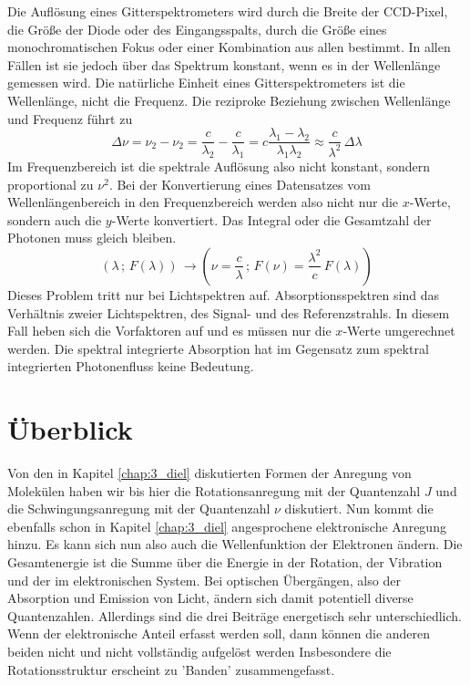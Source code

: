 Die Auflösung eines Gitterspektrometers wird durch die Breite der CCD-Pixel, die Größe der Diode oder des Eingangsspalts, durch die Größe eines monochromatischen Fokus oder einer Kombination aus allen bestimmt. In allen Fällen ist sie jedoch über das Spektrum konstant, wenn es in der Wellenlänge gemessen wird. Die natürliche Einheit eines Gitterspektrometers ist die Wellenlänge, nicht die Frequenz. Die reziproke Beziehung zwischen Wellenlänge und Frequenz führt zu 
\begin{equation}
 \Delta \nu = \nu_2 - \nu_2 = \frac{c}{\lambda_2} - \frac{c}{\lambda_1}  = c \frac{\lambda_1 - \lambda_2}{\lambda_1 \lambda_2} \approx \frac{c}{\lambda^2} \, \Delta \lambda
\end{equation}
Im Frequenzbereich ist die spektrale Auflösung also nicht konstant, sondern proportional zu $\nu^2$. Bei der Konvertierung eines Datensatzes vom Wellenlängenbereich in den Frequenzbereich werden also nicht nur die $x$-Werte, sondern auch die $y$-Werte konvertiert. Das Integral oder die Gesamtzahl der Photonen muss gleich bleiben.
\begin{equation}
 \left( \lambda \, ; \, F(\lambda) \right) \, \rightarrow  \left( \nu = \frac{c}{ \lambda} \, ; \,  F(\nu) = \frac{\lambda^2}{ c } \, F(\lambda) \right) 
\end{equation}
Dieses Problem tritt nur bei Lichtspektren auf. Absorptionsspektren sind das Verhältnis zweier Lichtspektren, des Signal- und des Referenzstrahls. In diesem Fall heben sich die Vorfaktoren auf und es müssen nur die $x$-Werte umgerechnet werden. Die spektral integrierte Absorption hat im Gegensatz zum spektral integrierten Photonenfluss keine Bedeutung.



\section{Überblick}

Von den in Kapitel \ref{chap:3_diel} diskutierten Formen der Anregung von Molekülen haben wir bis hier die Rotationsanregung mit der Quantenzahl $J$ und die Schwingungsanregung mit der Quantenzahl $\nu$ diskutiert. Nun kommt die ebenfalls schon in Kapitel  \ref{chap:3_diel} angesprochene elektronische Anregung hinzu. Es kann sich nun also auch die Wellenfunktion der Elektronen ändern. Die Gesamtenergie ist die Summe über die Energie in der Rotation, der Vibration und der im elektronischen System. Bei optischen Übergängen, also der Absorption und Emission von Licht, ändern sich damit potentiell diverse Quantenzahlen. Allerdings sind die drei Beiträge energetisch sehr unterschiedlich. Wenn der elektronische Anteil erfasst werden soll, dann können die anderen beiden nicht und nicht vollständig aufgelöst werden  Insbesondere die Rotationsstruktur erscheint zu 'Banden' zusammengefasst.

